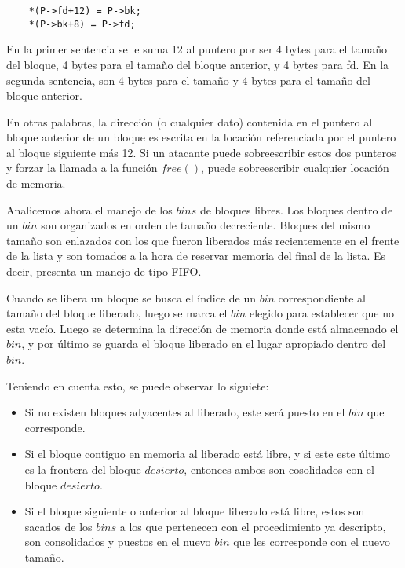 	\vspace{5 mm}
	
	\begin{lstlisting}
	*(P->fd+12) = P->bk;
	*(P->bk+8) = P->fd;
	\end{lstlisting}
	
	\vspace{5 mm}
	
	En la primer sentencia se le suma 12 al puntero por ser 4 bytes para el tama\~no del bloque, 4 bytes para el tama\~no del bloque anterior, y 4 bytes para fd. En la segunda sentencia, son 4 bytes para el tama\~no y 4 bytes para el tama\~no del bloque anterior.
	
	En otras palabras, la direcci\'on (o cualquier dato) contenida en el puntero al bloque anterior de un bloque es escrita en la locaci\'on referenciada por el puntero al bloque siguiente m\'as 12. Si un atacante puede sobreescribir estos dos punteros y forzar la llamada a la funci\'on $free()$, puede sobreescribir cualquier locaci\'on de memoria.
	
	Analicemos ahora el manejo de los $bins$ de bloques libres. Los bloques dentro de un $bin$ son organizados en orden de tama\~no decreciente. Bloques del mismo tama\~no son enlazados con los que fueron liberados m\'as recientemente en el frente de la lista y son tomados a la hora de reservar memoria del final de la lista. Es decir, presenta un manejo de tipo FIFO.
	
	Cuando se libera un bloque se busca el \'indice de un $bin$ correspondiente al tama\~no del bloque liberado, luego se marca el $bin$ elegido para establecer que no esta vac\'io. Luego se determina la direcci\'on de memoria donde est\'a almacenado el $bin$, y por \'ultimo se guarda el bloque liberado en el lugar apropiado dentro del $bin$.
	
	Teniendo en cuenta esto, se puede observar lo siguiete:
	\begin{itemize}
		\item Si no existen bloques adyacentes al liberado, este ser\'a puesto en el $bin$ que corresponde.
		\item Si el bloque contiguo en memoria al liberado est\'a libre, y si este este \'ultimo es la frontera del bloque $desierto$, entonces ambos son cosolidados con el bloque $desierto$.
		\item Si el bloque siguiente o anterior al bloque liberado est\'a libre, estos son sacados de los $bins$ a los que pertenecen con el procedimiento ya descripto, son consolidados y puestos en el nuevo $bin$ que les corresponde con el nuevo tama\~no.
	\end{itemize}
	
